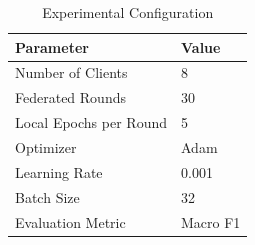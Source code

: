 \begin{table}[htbp]
\centering
\caption{Experimental Configuration}
\label{tab:experimental_configuration}
\begin{tabular}{ll}
\toprule
\textbf{Parameter} & \textbf{Value} \\
\midrule
Number of Clients & 8 \\
Federated Rounds & 30 \\
Local Epochs per Round & 5 \\
Optimizer & Adam \\
Learning Rate & 0.001 \\
Batch Size & 32 \\
Evaluation Metric & Macro F1 \\
\bottomrule
\end{tabular}
\end{table}
